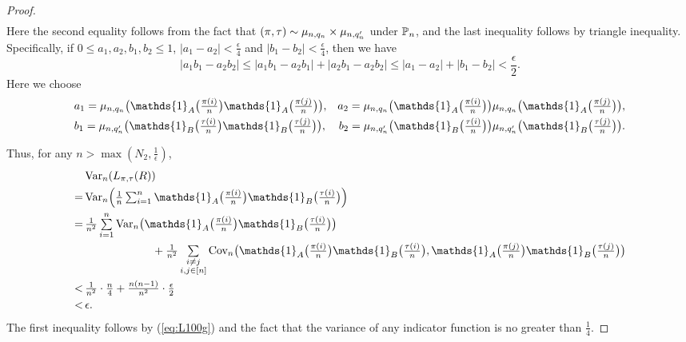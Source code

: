\begin{proof}
\begin{align}
\end{align}
Here the second equality follows from the fact that $(\pi, \tau) \sim \mu_{n, q_n} \times \mu_{n, q'_n}$ under $\mathbb{P}_n$, and the last inequality follows by triangle inequality. Specifically, if $0 \le a_1, a_2, b_1, b_2 \le 1$, $|a_1 - a_2| < \frac{\epsilon}{4}$ and $|b_1 - b_2| < \frac{\epsilon}{4}$, then we have
\[
|a_1 b_1 - a_2 b_2| \le |a_1 b_1 - a_2 b_1| + |a_2 b_1 - a_2 b_2| \le |a_1 - a_2| + |b_1 - b_2|< \frac{\epsilon}{2}.
\]
Here we choose
\begin{align*}
 &\textstyle a_1 = \n \big(\mathds{1}_A\big(\frac{\pi(i)}{n}\big)\mathds{1}_A\big(\frac{\pi(j)}{n}\big)\big),
 &\textstyle a_2 = \n \big(\mathds{1}_A\big(\frac{\pi(i)}{n}\big)\big) \n \big(\mathds{1}_A\big(\frac{\pi(j)}{n}\big)\big),\\
 &\textstyle b_1 = \mu_{n, q'_n} \big(\mathds{1}_B\big(\frac{\tau(i)}{n}\big)\mathds{1}_B\big(\frac{\tau(j)}{n}\big)\big),
 &\textstyle b_2 = \mu_{n, q'_n} \big(\mathds{1}_B\big(\frac{\tau(i)}{n}\big)\big) \mu_{n, q'_n} \big(\mathds{1}_B\big(\frac{\tau(j)}{n}\big)\big).
\end{align*}


Thus, for any $n > \max{(N_2, \frac{1}{\epsilon})}$,
\begin{align*}
  &\var_n (L_{\pi, \tau}(R))\\
 =\,&\textstyle\var_n \Big( \frac{1}{n}\sum_{i = 1}^{n}\mathds{1}_A\big(\frac{\pi(i)}{n}\big)\mathds{1}_B\big(\frac{\tau(i)}{n}\big) \Big)\\
 =\,&\textstyle\frac{1}{n^2}\sum\limits_{i = 1}^{n}\var_n\big(\mathds{1}_A\big(\frac{\pi(i)}{n}\big)\mathds{1}_B\big(\frac{\tau(i)}{n}\big)\big)\\
    &\textstyle\qquad\qquad\qquad + \frac{1}{n^2}\sum\limits_{\substack{ i \neq j\\
                                   i, j \in [n]}}\cov_n\big(\mathds{1}_A\big(\frac{\pi(i)}{n}\big)\mathds{1}_B\big(\frac{\tau(i)}{n}\big),
    \mathds{1}_A\big(\frac{\pi(j)}{n}\big)\mathds{1}_B\big(\frac{\tau(j)}{n}\big) \big)\\
 <\,&\textstyle\frac{1}{n^2}\cdot \frac{n}{4} + \frac{n(n-1)}{n^2}\cdot\frac{\epsilon}{2}\\
 <\,&\epsilon.
\end{align*}
The first inequality follows by (\ref{eq:L100g}) and the fact that the variance of any indicator function is no greater than $\frac{1}{4}$.
\end{proof}





